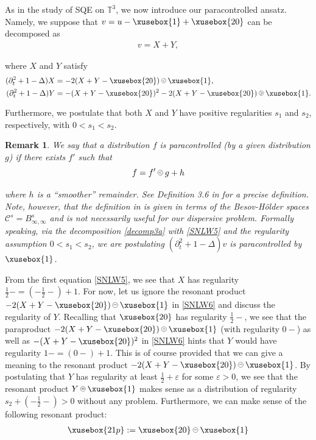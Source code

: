 \documentclass[%
11pt,  reqno]{amsart}
\def\<#1>{\xusebox{#1}}
\newcommand{\pe}{\mathbin{\scaleobj{0.7}{\tikz \draw (0,0) node[shape=circle,draw,inner sep=0pt,minimum size=8.5pt] {\scriptsize  $=$};}}}
\newcommand{\pl}{\mathbin{\scaleobj{0.7}{\tikz \draw (0,0) node[shape=circle,draw,inner sep=0pt,minimum size=8.5pt] {\scriptsize $<$};}}}
\newcommand{\pg}{\mathbin{\scaleobj{0.7}{\tikz \draw (0,0) node[shape=circle,draw,inner sep=0pt,minimum size=8.5pt] {\scriptsize $>$};}}}
\newcommand{\pge}{\mathbin{\scaleobj{0.7}{\tikz \draw (0,0) node[shape=circle,draw,inner sep=0pt,minimum size=8.5pt] {\scriptsize $\geqslant$};}}}
\newtheorem{remark}[theorem]{Remark}
\newcommand{\1}{\hspace{0.2mm}\text{I}\hspace{0.2mm}}
\newcommand{\noi}{\noindent}
\newcommand{\T}{\mathbb{T}}
\newcommand{\Dl}{\Delta}
\newcommand{\eps}{\varepsilon}
\newcommand{\dt}{\partial_t}
\numberwithin{equation}{section}
\numberwithin{theorem}{section}
\begin{document}
As in the study of SQE on $\T^3$, we now introduce our paracontrolled ansatz.
Namely, we suppose that $v = u - \<1> + \<20>$
can be decomposed as 
\begin{align}
v = X+ Y,
\label{decomp3a}
\end{align}

\noi
where $X$ and $Y$ satisfy
\begin{align}
 (\dt^2  +1 - \Dl) X  & = - 2 (X+Y-\<20>)\pl \<1>, \label{SNLW5}\\
 (\dt^2 +1  - \Dl) Y 
&  = - (X+Y-\<20>)^2 -  2(X+Y-\<20>)\pge \<1>.
\label{SNLW6}
\end{align}



\noi
Furthermore, 
we  postulate that both $X$ and $Y$ have positive regularities $s_1$ and $s_2$, respectively,
with $0 < s_1 < s_2$.


\begin{remark}\rm
We say that a distribution $f$ is paracontrolled (by a given distribution $g$)
if there exists $f'$ such that
\[ f= f' \pl g + h\]

\noi
where $h$ is a ``smoother'' remainder.
See Definition 3.6 in \cite{GIP}
for a precise definition.
Note, however, that the definition in \cite{GIP} 
is given in terms of the Besov-H\"older spaces $\mathcal{C}^s = B^s_{\infty, \infty}$
and is not necessarily useful for our dispersive problem.
Formally speaking, 
via the decomposition \eqref{decomp3a}
with \eqref{SNLW5} and the regularity assumption
$0 < s_1 < s_2$, 
we are postulating 
$(\dt^2  +1 - \Dl)v$ is paracontrolled by $\<1>$.


\end{remark}





From  the first equation  \eqref{SNLW5}, 
we see that
 $X$ has regularity $\frac 12- = (-\frac{1}{2}-) + 1$.
%
For now, let us ignore the resonant product 
$-2(X+Y-\<20>)\pe \<1>$ in \eqref{SNLW6}
and discuss the regularity of $Y$.
Recalling that $\<20>$ has regularity $\frac 12-$, 
we see that 
the paraproduct 
$- 2(X+Y-\<20>)\pg \<1>$ (with regularity $0-$)
as well as $- (X+Y-\<20>)^2 $ in \eqref{SNLW6} 
hints that $Y$ would have regularity $1- = (0-) + 1$.
This  is of course
provided that we can give a meaning
to the resonant product 
$-2(X+Y-\<20>)\pe \<1>$.
By postulating that $Y$ has regularity at least $\frac 12+\eps$ for some $\eps > 0$, 
we see that the resonant product 
$Y\pe \<1>$ makes sense as a distribution of regularity $s_2+( - \frac 12 -) > 0$
without any problem.
Furthermore, we can  make sense
of the following resonant product:
\begin{align}
\<21p> := \<20>\pe \<1>
\label{soX}
\end{align}
\end{document}
